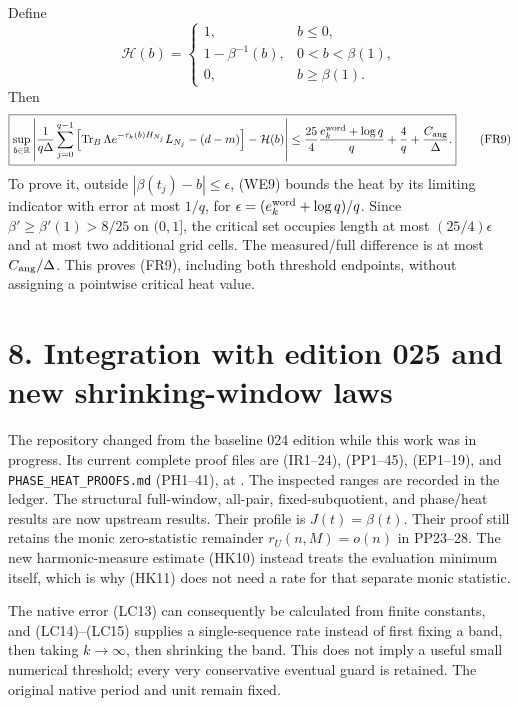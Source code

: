 \documentclass[10pt]{article}
\begin{document}
Define \[
 \mathcal H(b)=
 \begin{cases}
 1,&b\le0,\\
 1-\beta^{-1}(b),&0<b<\beta(1),\\
 0,&b\ge\beta(1).
 \end{cases}
\] Then \[
 \boxed{\sup_{b\in\mathbb R}\left|
 \frac1{q\Delta}\sum_{j=0}^{q-1}
 \left[\operatorname{Tr}_B\Lambda e^{-\tau_k(b)H_{N_j}}L_{N_j}
 -(d-m)\right]-\mathcal H(b)
 \right|
 \le\frac{25}{4}\frac{e_k^{\rm word}+\log q}{q}
 +\frac4q+\frac{C_{\rm ang}}\Delta.}
 \tag{FR9}
\] To prove it, outside \(|\beta(t_j)-b|\le\epsilon\), (WE9) bounds the heat by its limiting indicator with error at most \(1/q\), for \(\epsilon=(e_k^{\rm word}+\log q)/q\). Since \(\beta'\ge\beta'(1)>8/25\) on \((0,1]\), the critical set occupies length at most \((25/4)\epsilon\) and at most two additional grid cells. The measured/full difference is at most \(C_{\rm ang}/\Delta\). This proves (FR9), including both threshold endpoints, without assigning a pointwise critical heat value.

\section{8. Integration with edition 025 and new shrinking-window laws}\label{integration-with-edition-025-and-new-shrinking-window-laws}

The repository changed from the baseline 024 edition while this work was in progress. Its current complete proof files are  (IR1--24),  (PP1--45),  (EP1--19), and \texttt{PHASE\_HEAT\_PROOFS.md} (PH1--41), at . The inspected ranges are recorded in the ledger. The structural full-window, all-pair, fixed-subquotient, and phase/heat results are now upstream results. Their profile is \(J(t)=\beta(t)\). Their proof still retains the monic zero-statistic remainder \(r_U(n,M)=o(n)\) in PP23--28. The new harmonic-measure estimate (HK10) instead treats the evaluation minimum itself, which is why (HK11) does not need a rate for that separate monic statistic.

The native error (LC13) can consequently be calculated from finite constants, and (LC14)--(LC15) supplies a single-sequence rate instead of first fixing a band, then taking \(k\to\infty\), then shrinking the band. This does not imply a useful small numerical threshold; every very conservative eventual guard is retained. The original native period and unit remain fixed.
\end{document}
